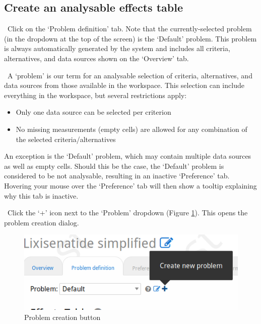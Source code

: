 \documentclass[00_mcda_tutorial.tex]{subfiles}
\begin{document}
\subsection*{Create an analysable effects table}
\leftpointright \, Click on the ‘Problem definition’ tab. Note that the currently-selected problem (in the dropdown at the top of the screen) is the ‘Default’ problem. This problem is always automatically generated by the system and includes all criteria, alternatives, and data sources shown on the ‘Overview’ tab.
\newline

\noindent \faGraduationCap \, A ‘problem’ is our term for an analysable selection of criteria, alternatives, and data sources from those available in the workspace. This selection can include everything in the workspace, but several restrictions apply:

\begin{itemize}
\item Only one data source can be selected per criterion
\item No missing measurements (empty cells) are allowed for any combination of the selected criteria/alternatives
\end{itemize}
	
\noindent An exception is the ‘Default’ problem, which may contain multiple data sources as well as empty cells. Should this be the case, the ‘Default’ problem is considered to be not analysable, resulting in an inactive ‘Preference’ tab. Hovering your mouse over the ‘Preference’ tab will then show a tooltip explaining why this tab is inactive.

\noindent \leftpointright \, Click the ‘+’ icon  next to the ‘Problem’ dropdown (Figure \ref{fig:create_problem}). This opens the problem creation dialog.

\begin{figure}[!h]
    \centering
	\includegraphics[width=.8\textwidth]{fig/createProblem.png}
    \caption{Problem creation button}
	\label{fig:create_problem}
\end{figure}
\end{document}

